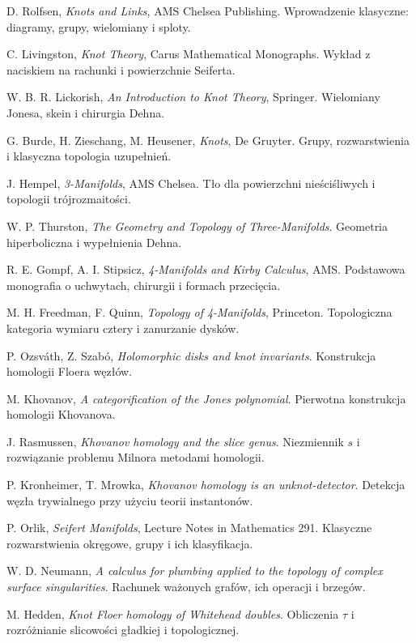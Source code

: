 \documentclass[11pt,a4paper]{report}
\numberwithin{equation}{section}
\theoremstyle{plain}
\theoremstyle{definition}
\theoremstyle{remark}
\begin{document}
\begin{enumerate}[label={[\arabic*]},leftmargin=*,itemsep=3pt]
\item D. Rolfsen, \emph{Knots and Links}, AMS Chelsea Publishing.
Wprowadzenie klasyczne: diagramy, grupy, wielomiany i sploty.
\item C. Livingston, \emph{Knot Theory}, Carus Mathematical Monographs.
Wykład z naciskiem na rachunki i powierzchnie Seiferta.
\item W. B. R. Lickorish, \emph{An Introduction to Knot Theory}, Springer.
Wielomiany Jonesa, skein i chirurgia Dehna.
\item G. Burde, H. Zieschang, M. Heusener, \emph{Knots}, De Gruyter.
Grupy, rozwarstwienia i klasyczna topologia uzupełnień.
\item J. Hempel, \emph{3-Manifolds}, AMS Chelsea.
Tło dla powierzchni nieściśliwych i topologii trójrozmaitości.
\item W. P. Thurston, \emph{The Geometry and Topology of Three-Manifolds}.
Geometria hiperboliczna i wypełnienia Dehna.
\item R. E. Gompf, A. I. Stipsicz, \emph{4-Manifolds and Kirby Calculus}, AMS.
Podstawowa monografia o uchwytach, chirurgii i formach przecięcia.
\item M. H. Freedman, F. Quinn, \emph{Topology of 4-Manifolds}, Princeton.
Topologiczna kategoria wymiaru cztery i zanurzanie dysków.
\item P. Ozsváth, Z. Szabó, \emph{Holomorphic disks and knot invariants}.
Konstrukcja homologii Floera węzłów.
\item M. Khovanov, \emph{A categorification of the Jones polynomial}.
Pierwotna konstrukcja homologii Khovanova.
\item J. Rasmussen, \emph{Khovanov homology and the slice genus}.
Niezmiennik $s$ i rozwiązanie problemu Milnora metodami homologii.
\item P. Kronheimer, T. Mrowka, \emph{Khovanov homology is an unknot-detector}.
Detekcja węzła trywialnego przy użyciu teorii instantonów.
\item P. Orlik, \emph{Seifert Manifolds}, Lecture Notes in Mathematics 291.
Klasyczne rozwarstwienia okręgowe, grupy i ich klasyfikacja.
\item W. D. Neumann, \emph{A calculus for plumbing applied to the topology of complex surface singularities}.
Rachunek ważonych grafów, ich operacji i brzegów.
\item M. Hedden, \emph{Knot Floer homology of Whitehead doubles}.
Obliczenia $\tau$ i rozróżnianie slicowości gładkiej i topologicznej.

\end{enumerate}
\end{document}

